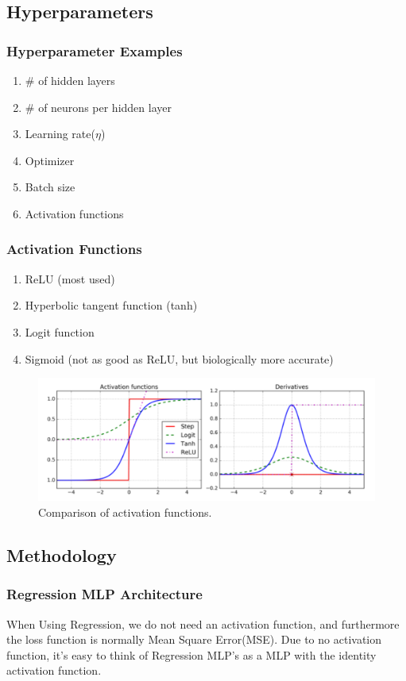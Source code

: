 \documentclass[article]{llncs}
\begin{document}
\subsection{Hyperparameters}
\subsubsection{Hyperparameter Examples}
\begin{enumerate}
    \item $\#$ of hidden layers
    \item $\#$ of neurons per hidden layer
    \item Learning rate($\eta$)
    \item Optimizer
    \item Batch size
    \item Activation functions
\end{enumerate}

\subsubsection{Activation Functions}
\begin{enumerate}
    \item ReLU (most used)
    \item Hyperbolic tangent function (tanh)
    \item Logit function
    \item Sigmoid (not as good as ReLU, but biologically more accurate)
\end{enumerate}

\begin{figure}[H]
\centering
\includegraphics[scale=0.5]{fig6.PNG}
\caption{Comparison of activation functions.} \label{fig6}
\end{figure}

\subsection{Methodology}
\subsubsection{Regression MLP Architecture}
When Using Regression, we do not need an activation function, and furthermore the loss function is normally Mean Square Error(MSE). Due to no activation function, it's easy to think of Regression MLP's as a MLP with the identity activation function.
\end{document}

